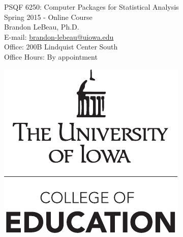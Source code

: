 \documentclass[11pt,article,oneside]{memoir}
\begin{document}
\setsansfont[Mapping=tex-text]{Myriad Pro} 
\setmonofont[Mapping=tex-text,Scale=0.8]{Pragmata} 

\def\ind{\hangindent=1 true cm\hangafter=1 \noindent}
\def\labelitemi{$\cdot$}


  

\begin{minipage}[b]{.7\linewidth}
\begin{flushleft}
{\huge PSQF 6250: Computer Packages for Statistical Analysis} \\[.1in]
{\large\sffamily Spring 2015 - Online Course} \\
\vspace*{.25in}
{\large Brandon LeBeau, Ph.D.} \\[.05in]
{\normalsize E-mail: \href{mailto:brandon-lebeau@uiowa.edu}{brandon-lebeau@uiowa.edu} \\Office: 200B Lindquist Center South \\ Office Hours: By appointment}
\end{flushleft}
\end{minipage}
\begin{minipage}[t]{.3\linewidth}
\includegraphics[width=.9\linewidth]{DomeUIed}
\end{minipage}
\end{document}

